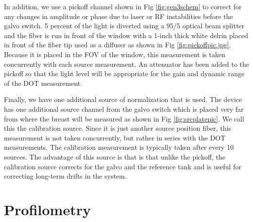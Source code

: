 In addition, we use a pickoff channel shown in Fig \ref{fig:gen3schem} to correct for any changes in amplitude or phase due to laser or RF instabilities before the galvo switch. 5 percent of the light is diverted using a 95/5 optical beam splitter and the fiber is run in front of the window with a 1-inch thick white delrin placed in front of the fiber tip used as a diffuser as shown in Fig \ref{fig:pickoffpic.jpg}. Because it is placed in the FOV of the window, this measurement is taken concurrently with each source measurement. An attenuator has been added to the pickoff so that the light level will be appropriate for the gain and dynamic range of the DOT measurement. 

Finally, we have one additional source of normalization that is used. The device has one additional source channel from the galvo switch which is placed very far from where the breast will be measured as shown in Fig \ref{fig:srcplatepic}. We call this the calibration source. Since it is just another source position fiber, this measurement is not taken concurrently, but rather in series with the DOT measurements. The calibration measurement is typically taken after every 10 sources. The advantage of this source is that is that unlike the pickoff, the calibration source corrects for the galvo and the reference tank and is useful for correcting long-term drifts in the system.

\section{Profilometry}
\label{sec:profilometry}
